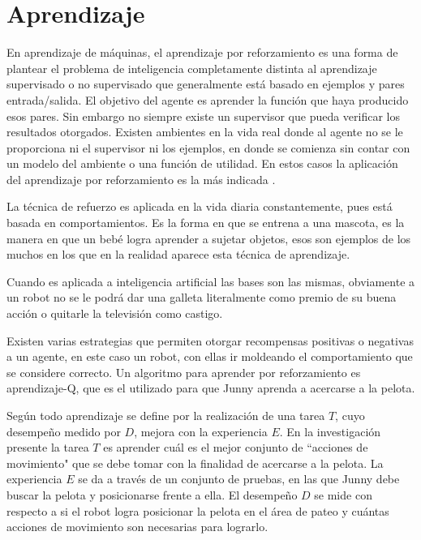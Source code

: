 
\section{Aprendizaje}\label{aprendizaje}

En aprendizaje de m\'aquinas, el aprendizaje por reforzamiento es una forma de plantear el problema de inteligencia completamente distinta al aprendizaje supervisado o no supervisado que generalmente está basado en ejemplos y pares entrada/salida. El objetivo del agente es aprender la funci\'on que haya producido esos pares. Sin embargo no siempre existe un supervisor que pueda verificar los resultados otorgados.
Existen ambientes en la vida real donde al agente no se le proporciona ni el supervisor ni los ejemplos, en donde se comienza sin contar con un modelo del ambiente o una funci\'on de utilidad. En estos casos la aplicaci\'on del aprendizaje por reforzamiento es la más indicada \cite{peterAndNorvig}.

La t\'ecnica de refuerzo es aplicada en la vida diaria constantemente, pues está basada en comportamientos. Es la forma en que se entrena a una mascota, es la manera en que un bebé logra aprender a sujetar objetos, esos son ejemplos de los muchos en los que en la realidad aparece esta t\'ecnica de aprendizaje.

Cuando es aplicada a inteligencia artificial las bases son las mismas, obviamente a un robot no se le podr\'a dar una galleta literalmente como premio de su buena acci\'on o quitarle la televisi\'on como castigo.
 
Existen varias estrategias que permiten otorgar recompensas positivas o negativas a un agente, en este caso un robot, con ellas ir moldeando el comportamiento que se considere correcto. Un algoritmo para aprender por reforzamiento es aprendizaje-Q, que es el utilizado para que Junny aprenda a acercarse a la pelota.
 


Según \cite{Mitchell} todo aprendizaje se define por la realización de una tarea $T$, cuyo desempeño medido por $D$, mejora con la experiencia $E$. En la investigación presente la tarea $T$ es aprender cuál es el mejor conjunto de ``acciones de movimiento" que se debe tomar con la finalidad de acercarse a la pelota. La experiencia $E$ se da a través de un conjunto de pruebas, en las que Junny debe buscar la pelota y posicionarse frente a ella. El desempeño $D$ se mide con respecto a si el robot logra posicionar la pelota en el área de pateo y cuántas acciones de movimiento son necesarias para lograrlo.

